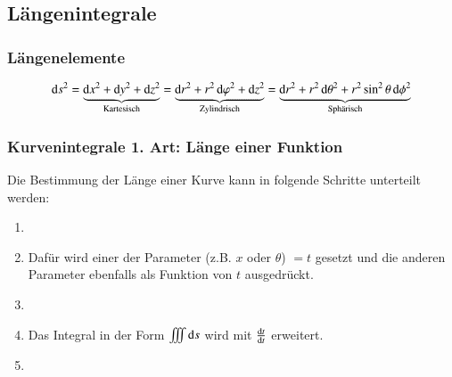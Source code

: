 \subsection{Längenintegrale}
\subsubsection{Längenelemente}\label{section:int_multivar:längenelemente}
$$
 \diff s^2 
    = \underbrace{\diff x^2 + \diff y^2 + \diff z^2}_{\text{Kartesisch}}
    = \underbrace{\diff r^2 + r^2 \diff \varphi^2 + \diff z^2}_{\text{Zylindrisch}}
    = \underbrace{\diff r^2 + r^2 \diff \theta^2 + r^2 \sin^2 \theta \diff \phi^2}_{\text{Sphärisch}}
$$
\subsubsection{Kurvenintegrale 1. Art: Länge einer Funktion}
Die Bestimmung der Länge einer Kurve kann in folgende Schritte unterteilt werden:
\begin{enumerate}
    \item {}
    \item[] Dafür wird einer der Parameter (z.B. $x$ oder $\theta$) $=t$ gesetzt und die anderen Parameter ebenfalls als Funktion von $t$ ausgedrückt.
    \item {}
    \item[] Das Integral in der Form $ \iiint \mathop{} \! \mathrm{d} s $ wird mit $\frac{\mathop{} \! \mathrm{d} t}{\mathop{} \! \mathrm{d} t}$ erweitert.
    \item {}
\end{enumerate}

